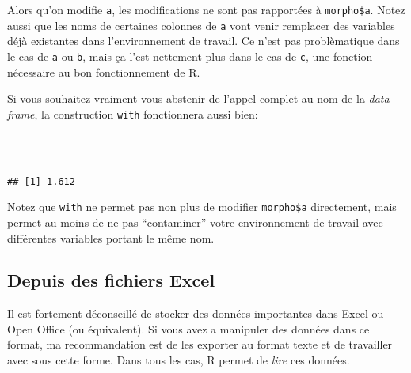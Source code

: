 \noindent Alors qu'on modifie \texttt{a}, les modifications ne sont pas rapportées à \texttt{morpho\$a}.
Notez aussi que les noms de certaines colonnes de \texttt{a} vont venir remplacer des variables déjà existantes dans l'environnement de travail.
Ce n'est pas problèmatique dans le cas de \texttt{a} ou \texttt{b}, mais ça l'est nettement plus dans le cas de \texttt{c}, une fonction nécessaire au bon fonctionnement de R.  

Si vous souhaitez vraiment vous abstenir de l'appel complet au nom de la \emph{data frame}, la construction \texttt{with} fonctionnera aussi bien:

\begin{knitrout}
\color{fgcolor}\begin{kframe}
\begin{flushleft}
\ttfamily\noindent
{}\hlkeyword{(}\hlkeyword{,}{\ }\hlkeyword{\usebox{\hlnormalsizeboxopenbrace}}\hspace*{\fill}\\
\hlstd{}{\ }{\ }{\ }{\ }\hlkeyword{(}\hlkeyword{,}{\ }\hlargument{=}{\ }\hlkeyword{)}\hspace*{\fill}\\
\hlstd{}\hlkeyword{\usebox{\hlnormalsizeboxclosebrace}}\hlkeyword{)}\mbox{}
\normalfont
\end{flushleft}
\begin{verbatim}
## [1] 1.612
\end{verbatim}
\end{kframe}
\end{knitrout}


\noindent Notez que \texttt{with} ne permet pas non plus de modifier \texttt{morpho\$a} directement, mais permet au moins de ne pas ``contaminer'' votre environnement de travail avec différentes variables portant le même nom.

\subsection{Depuis des fichiers Excel}

Il est fortement déconseillé de stocker des données importantes dans Excel ou Open Office (ou équivalent).
Si vous avez a manipuler des données dans ce format, ma recommandation est de les exporter au format texte et de travailler avec sous cette forme.
Dans tous les cas, R permet de \emph{lire} ces données.

